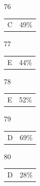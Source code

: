 \documentclass[12pt]{article}
\begin{document}
\begin{multicols}{5}
\begin{enumerate}
\item[]
\item[76] \begin{tabular}{cc} C & 49\%\end{tabular}
\item[77] \begin{tabular}{cc} E & 44\%\end{tabular}
\item[78] \begin{tabular}{cc} E & 52\%\end{tabular}
\item[79] \begin{tabular}{cc} D & 69\%\end{tabular}
\item[80] \begin{tabular}{cc} D & 28\%\end{tabular}

\item[]


\end{enumerate}
\end{multicols}
\end{document}
